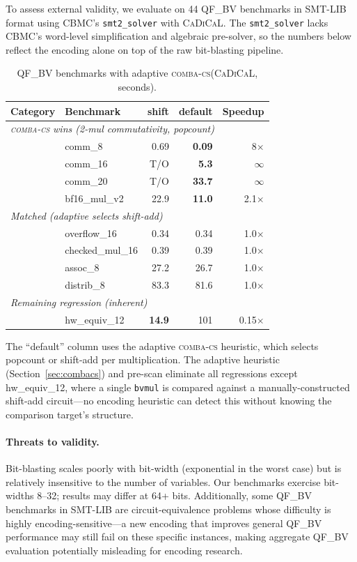 \documentclass[a4paper]{ceurart}
\newcommand{\combacs}{\textsc{comba-cs}\xspace}
\newcommand{\cadical}{\textsc{CaDiCaL}\xspace}
\newcommand{\cbmc}{\textsc{CBMC}\xspace}
\begin{document}
To assess external validity, we evaluate on 44 QF\_BV benchmarks in
SMT-LIB format using \cbmc's \texttt{smt2\_solver} with \cadical.
The \texttt{smt2\_solver} lacks \cbmc's word-level simplification
and algebraic pre-solver, so the numbers below reflect the
encoding alone on top of the raw bit-blasting pipeline.

\begin{table}[ht]
\caption{QF\_BV benchmarks with adaptive \combacs (\cadical, seconds).}
\label{tab:qfbv}
\centering
\begin{tabular}{llrrr}
\toprule
Category & Benchmark & shift & default & Speedup \\
\midrule
\multicolumn{5}{l}{\emph{\combacs wins (2-mul commutativity, popcount)}} \\
& comm\_8 & 0.69 & \textbf{0.09} & 8$\times$ \\
& comm\_16 & T/O & \textbf{5.3} & $\infty$ \\
& comm\_20 & T/O & \textbf{33.7} & $\infty$ \\
& bf16\_mul\_v2 & 22.9 & \textbf{11.0} & 2.1$\times$ \\
\midrule
\multicolumn{5}{l}{\emph{Matched (adaptive selects shift-add)}} \\
& overflow\_16 & 0.34 & 0.34 & 1.0$\times$ \\
& checked\_mul\_16 & 0.39 & 0.39 & 1.0$\times$ \\
& assoc\_8 & 27.2 & 26.7 & 1.0$\times$ \\
& distrib\_8 & 83.3 & 81.6 & 1.0$\times$ \\
\midrule
\multicolumn{5}{l}{\emph{Remaining regression (inherent)}} \\
& hw\_equiv\_12 & \textbf{14.9} & 101 & 0.15$\times$ \\
\bottomrule
\end{tabular}
\end{table}

The ``default'' column uses the adaptive \combacs heuristic,
which selects popcount or shift-add per multiplication.
The adaptive heuristic (Section~\ref{sec:combacs}) and pre-scan
eliminate all regressions except hw\_equiv\_12, where a single
\texttt{bvmul} is compared against a manually-constructed shift-add
circuit---no encoding heuristic can detect this without knowing the
comparison target's structure.

\paragraph{Threats to validity.}
Bit-blasting scales poorly with bit-width (exponential in the worst
case) but is relatively insensitive to the number of variables.
Our benchmarks exercise bit-widths 8--32; results may differ at
64+ bits. Additionally, some QF\_BV benchmarks in SMT-LIB are
circuit-equivalence problems whose difficulty is highly
encoding-sensitive---a new encoding that improves general QF\_BV
performance may still fail on these specific instances, making
aggregate QF\_BV evaluation potentially misleading for encoding
research.
\end{document}
